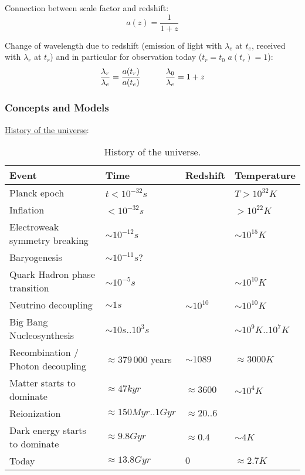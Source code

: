 			\noindent
			Connection between scale factor and redshift:
			\begin{equation}
				a(z) = \frac{1}{1+z}
			\end{equation}

			\noindent
			Change of wavelength due to redshift (emission of light with $\lambda_e$ at $t_e$, received with $\lambda_r$ at $t_r$) and in particular for observation today ($t_r=t_0$ \ie $a(t_r)=1$):
			\begin{equation}
				\frac{\lambda_r}{\lambda_e} = \frac{a(t_r)}{a(t_e)}
				\hspace{30pt}
				\frac{\lambda_0}{\lambda_e} = 1+z
			\end{equation}

		\subsubsection{Concepts and Models}
			\noindent
			\href{https://en.wikipedia.org/wiki/Chronology_of_the_universe#Tabular_summary}{History of the universe}:
			\begin{table}[ht]
				\begin{center}
					\begin{tabular}{ l | l | l | l }
						Event & Time & Redshift & Temperature \\ \hline
						Planck epoch & $t < 10^{-32}\unit{s}$ & & $T>10^{32}\unit{K}$ \\
						Inflation & $< 10^{-32}\unit{s}$ & & $>10^{22}\unit{K}$ \\
						Electroweak symmetry breaking & $\sim 10^{-12}\unit{s}$ & & $\sim10^{15}\unit{K}$ \\
						Baryogenesis & $\sim 10^{-11}\unit{s}$? & & \\
						Quark Hadron phase transition & $\sim 10^{-5}\unit{s}$ & & $\sim 10^{10}\unit{K}$ \\
						Neutrino decoupling & $\sim 1\unit{s}$ & $\sim 10^{10}$ & $\sim 10^{10}\unit{K}$ \\
						Big Bang Nucleosynthesis & $\sim 10 \unit{s}..10^3\unit{s}$ & & $\sim 10^9\unit{K}..10^7\unit{K}$ \\
						Recombination / Photon decoupling & $\approx 379\,000$ years & $\sim 1089$ & $\approx 3000\unit{K}$ \\
						Matter starts to dominate & $\approx 47\unit{kyr}$ & $\approx 3600$ & $\sim 10^4\unit{K}$ \\
						Reionization & $\approx 150\unit{Myr}..1\unit{Gyr}$ & $\approx 20..6$ &  \\
						Dark energy starts to dominate & $\approx 9.8\unit{Gyr}$ & $\approx 0.4$ & $\sim 4\unit{K}$ \\
						Today & $\approx 13.8\unit{Gyr}$ & $0$ & $\approx 2.7\unit{K}$ \\
					\end{tabular}
					\caption{History of the universe.}
				\end{center}
			\end{table}

